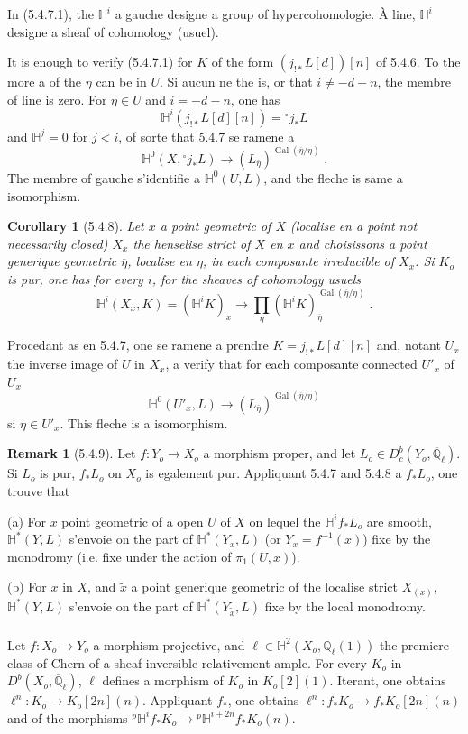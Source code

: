 \documentclass[12pt,a4paper]{article}
\theoremstyle{plain}
\newtheorem{corollary}[theorem]{Corollary}
\theoremstyle{definition}
\newtheorem{remark}[theorem]{Remark}
\theoremstyle{remark}
\DeclareMathOperator{\Gal}{Gal}
\newcommand{\HH}{\mathbb{H}}
\newcommand{\QQ}{\mathbb{Q}}
\begin{document}
In (5.4.7.1), the $\HH^i$ a gauche designe a group of hypercohomologie. \`A line, $\HH^i$ designe a sheaf of cohomology (usuel).

It is enough to verify (5.4.7.1) for $K$ of the form $(j_{!*}L[d])[n]$ of 5.4.6. To the more a of the $\eta$ can be in $U$. Si aucun ne the is, or that $i \neq -d-n$, the membre of line is zero. For $\eta \in U$ and $i = -d-n$, one has
\[
\HH^i(j_{!*}L[d][n]) = {}^{\circ}j_*L
\]
and $\HH^j = 0$ for $j < i$, of sorte that 5.4.7 se ramene a
\[
\HH^0(X, {}^{\circ}j_*L) \longrightarrow (L_{\overline{\eta}})^{\Gal(\overline{\eta}/\eta)}\;.
\]
The membre of gauche s'identifie a $\HH^0(U, L)$, and the fleche is same a isomorphism.

\begin{corollary}[5.4.8]
Let $x$ a point geometric of $X$ (localise en a point not necessarily closed) $X_x$ the henselise strict of $X$ en $x$ and choisissons a point generique geometric $\overline{\eta}$, localise en $\eta$, in each composante irreducible of $X_x$. Si $K_o$ is pur, one has for every $i$, for the sheaves of cohomology usuels
\[
\HH^i(X_x, K) = (\HH^iK)_x \longrightarrow \prod_{\eta} (\HH^iK)_{\overline{\eta}}^{\Gal(\overline{\eta}/\eta)}\;.
\]
\end{corollary}

Procedant as en 5.4.7, one se ramene a prendre $K = j_{!*}L[d][n]$ and, notant $U_x$ the inverse image of $U$ in $X_x$, a verify that for each composante connected $U'_x$ of $U_x$
\[
\HH^0(U'_x, L) \longrightarrow (L_{\overline{\eta}})^{\Gal(\overline{\eta}/\eta)}
\]
si $\eta \in U'_x$. This fleche is a isomorphism.

\begin{remark}[5.4.9]
Let $f: Y_o \to X_o$ a morphism proper, and let $L_o \in D^b_c(Y_o, \overline{\QQ}_{\ell})$. Si $L_o$ is pur, $f_*L_o$ on $X_o$ is egalement pur. Appliquant 5.4.7 and 5.4.8 a $f_*L_o$, one trouve that

(a) For $x$ point geometric of a open $U$ of $X$ on lequel the $\HH^if_*L_o$ are smooth, $\HH^*(Y, L)$ s'envoie on the part of $\HH^*(Y_x, L)$ (or $Y_x = f^{-1}(x)$) fixe by the monodromy (i.e. fixe under the action of $\pi_1(U, x)$).

(b) For $x$ in $X$, and $\tilde{x}$ a point generique geometric of the localise strict $X_{(x)}$, $\HH^*(Y, L)$ s'envoie on the part of $\HH^*(Y_{\tilde{x}}, L)$ fixe by the local monodromy.
\end{remark}

\subsubsection{}
Let $f: X_o \to Y_o$ a morphism projective, and $\ell \in \HH^2(X_o, \QQ_{\ell}(1))$ the premiere class of Chern of a sheaf inversible relativement ample. For every $K_o$ in $D^b(X_o, \overline{\QQ}_{\ell})$, $\ell$ defines a morphism of $K_o$ in $K_o[2](1)$. Iterant, one obtains $\ell^n: K_o \to K_o[2n](n)$. Appliquant $f_*$, one obtains $\ell^n: f_*K_o \to f_*K_o[2n](n)$ and of the morphisms ${}^{p}\HH^if_*K_o \to {}^{p}\HH^{i+2n}f_*K_o(n)$.
\end{document}
